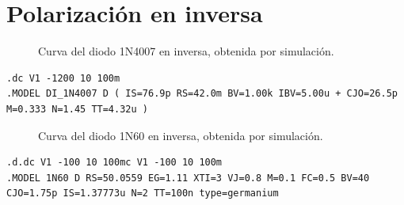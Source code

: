 \section{Polarización en inversa}

\begin{figure}[H]
    \centering
    \caption{Curva del diodo 1N4007 en inversa, obtenida por simulación.}
    \label{fig:1N4007Inversa}
\end{figure}

\begin{lstlisting}[style=ltspice, caption={Parámetros de simulación LTspice}]
.dc V1 -1200 10 100m
.MODEL DI_1N4007 D ( IS=76.9p RS=42.0m BV=1.00k IBV=5.00u + CJO=26.5p M=0.333 N=1.45 TT=4.32u )
\end{lstlisting}

\begin{figure}[H]
    \centering
    \caption{Curva del diodo 1N60 en inversa, obtenida por simulación.}
    \label{fig:1N60Inversa}
\end{figure}

\begin{lstlisting}[style=ltspice, caption={Parámetros de simulación LTspice}]
.d.dc V1 -100 10 100mc V1 -100 10 100m
.MODEL 1N60 D RS=50.0559 EG=1.11 XTI=3 VJ=0.8 M=0.1 FC=0.5 BV=40 CJO=1.75p IS=1.37773u N=2 TT=100n type=germanium
\end{lstlisting}

